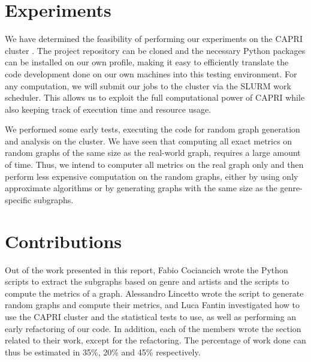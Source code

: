 \documentclass[a4paper, 12pt, conference]{ieeeconf}      %
\begin{document}
\section{Experiments}

We have determined the feasibility of performing our experiments on the CAPRI cluster \cite{capri}. The project repository can be cloned and the necessary Python packages can be installed on our own profile, making it easy to efficiently translate the code development done on our own machines into this testing environment. For any computation, we will submit our jobs to the cluster via the SLURM work scheduler. This allows us to exploit the full computational power of CAPRI while also keeping track of execution time and resource usage.

We performed some early tests, executing the code for random graph generation and analysis on the cluster. We have seen that computing all exact metrics on random graphs of the same size as the real-world graph, requires a large amount of time. Thus, we intend to computer all metrics on the real graph only and then perform less expensive computation on the random graphs, either by using only approximate algorithms or by generating graphs with the same size as the genre-specific subgraphs.

\section*{Contributions}

Out of the work presented in this report, Fabio Cociancich wrote the Python scripts to extract the subgraphs based on genre and artists and the scripts to compute the metrics of a graph.
Alessandro Lincetto wrote the script to generate random graphs and compute their metrics, and Luca Fantin investigated how to use the CAPRI cluster and the statistical tests to use, as well as performing an early refactoring of our code. In addition, each of the members wrote the section related to their work, except for the refactoring. The percentage of work done can thus be estimated in 35\%, 20\% and 45\% respectively.



\printbibliography[nottype=online]
\end{document}
